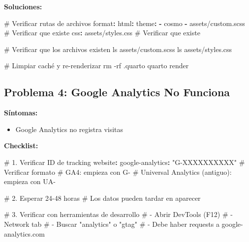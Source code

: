 \documentclass[
  doc,
  floatsintext,
  longtable,
  a4paper,
  nolmodern,
  notxfonts,
  notimes,
  12pt,
  colorlinks=true,linkcolor=blue,citecolor=blue,urlcolor=blue]{apa7}
\newenvironment{Shaded}{\begin{snugshade}}{\end{snugshade}}
\newcommand{\AttributeTok}[1]{\textcolor[rgb]{0.40,0.45,0.13}{#1}}
\newcommand{\CommentTok}[1]{\textcolor[rgb]{0.37,0.37,0.37}{#1}}
\newcommand{\FunctionTok}[1]{\textcolor[rgb]{0.28,0.35,0.67}{#1}}
\newcommand{\KeywordTok}[1]{\textcolor[rgb]{0.00,0.23,0.31}{\textbf{#1}}}
\newcommand{\StringTok}[1]{\textcolor[rgb]{0.13,0.47,0.30}{#1}}
\providecommand{\tightlist}{%
  \setlength{\itemsep}{0pt}\setlength{\parskip}{0pt}}
\begin{document}
\textbf{Soluciones:}

\begin{Shaded}
\begin{Highlighting}[]
\CommentTok{\# Verificar rutas de archivos}
\FunctionTok{format}\KeywordTok{:}
\AttributeTok{  }\FunctionTok{html}\KeywordTok{:}
\AttributeTok{    }\FunctionTok{theme}\KeywordTok{:}
\AttributeTok{      }\KeywordTok{{-}}\AttributeTok{ cosmo}
\AttributeTok{      }\KeywordTok{{-}}\AttributeTok{ assets/custom.scss}\CommentTok{    \# Verificar que existe}
\AttributeTok{    }\FunctionTok{css}\KeywordTok{:}\AttributeTok{ assets/styles.css}\CommentTok{    \# Verificar que existe}

\CommentTok{\# Verificar que los archivos existen}
\AttributeTok{ls assets/custom.scss}
\AttributeTok{ls assets/styles.css}

\CommentTok{\# Limpiar caché y re{-}renderizar}
\AttributeTok{rm {-}rf .quarto}
\AttributeTok{quarto render}
\end{Highlighting}
\end{Shaded}

\subsection{Problema 4: Google Analytics No
Funciona}\label{problema-4-google-analytics-no-funciona}

\textbf{Síntomas:}

\begin{itemize}
\tightlist
\item
  Google Analytics no registra visitas
\end{itemize}

\textbf{Checklist:}

\begin{Shaded}
\begin{Highlighting}[]
\CommentTok{\# 1. Verificar ID de tracking}
\FunctionTok{website}\KeywordTok{:}
\AttributeTok{  }\FunctionTok{google{-}analytics}\KeywordTok{:}\AttributeTok{ }\StringTok{"G{-}XXXXXXXXXX"}\CommentTok{  \# Verificar formato}
\CommentTok{  \# GA4: empieza con G{-}}
\CommentTok{  \# Universal Analytics (antiguo): empieza con UA{-}}

\CommentTok{\# 2. Esperar 24{-}48 horas}
\CommentTok{\# Los datos pueden tardar en aparecer}

\CommentTok{\# 3. Verificar con herramientas de desarrollo}
\CommentTok{\# {-} Abrir DevTools (F12)}
\CommentTok{\# {-} Network tab}
\CommentTok{\# {-} Buscar "analytics" o "gtag"}
\CommentTok{\# {-} Debe haber requests a google{-}analytics.com}
\end{Highlighting}
\end{Shaded}
\end{document}
